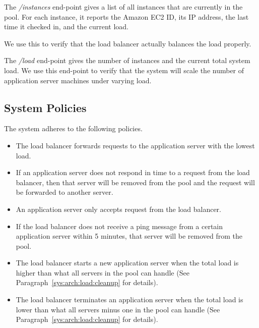 			The \textit{/instances} end-point gives a list of all instances that are currently in the pool.
			For each instance, it reports the Amazon EC2 ID, its IP address, the last time it checked in, and the current load.
			
			We use this to verify that the load balancer actually balances the load properly.
			
			The \textit{/load} end-point gives the number of instances and the current total system load.
			We use this end-point to verify that the system will scale the number of application server machines under varying load.

\subsection{System Policies}
	The system adheres to the following policies.

	\begin{itemize}
		\item The load balancer forwards requests to the application server with the lowest load.
		\item If an application server does not respond in time to a request from the load balancer, then that server will be removed from the pool and the request will be forwarded to another server.
		\item An application server only accepts request from the load balancer.
		\item If the load balancer does not receive a ping message from a certain application server within 5 minutes, that server will be removed from the pool.
		\item The load balancer starts a new application server when the total load is higher than what all servers in the pool can handle (See Paragraph~\ref{sys:arch:load:cleanup} for details).
		\item The load balancer terminates an application server when the total load is lower than what all servers minus one in the pool can handle (See Paragraph~\ref{sys:arch:load:cleanup} for details).
	\end{itemize}
	